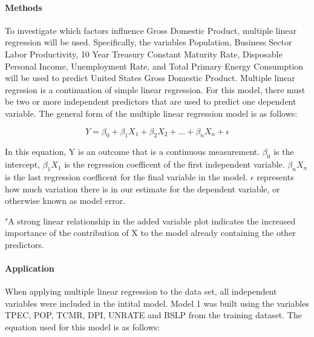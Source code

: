 \documentclass[12pt]{article}
\begin{document}







\paragraph{Methods} 
To investigate which factors influence Gross Domestic Product, multiple linear regression will be used. 
Specifically, the variables Population, Business Sector Labor Productivity, 10 Year Treasury Constant Maturity Rate, Disposable Personal Income, Unemployment Rate, and Total Primary Energy Consumption will be used to predict United States Gross Domestic Product.
Multiple linear regrssion is a continuation of simple linear regression. 
For this model, there must be two or more independent predictors that are used to predict one dependent variable. 
The general form of the multiple linear regression model is as follows: 


\begin{equation}
  Y = \beta_0 + \beta_1 X_1 + \beta_2 X_2 + ... + \beta_n X_n + \epsilon
\end{equation}

In this equation, Y is an outcome that is a continuous measurement. $\beta_0$ is the intercept, $\beta_1 X_1$ is the regression coefficent of the first independent variable. 
$\beta_n X_n$ is the last regression coefficent for the final variable in the model.
$\epsilon$ represents how much variation there is in our estimate for the dependent variable, or otherwise known as model error. 


 


"A strong linear relationship in the added variable plot indicates the increased importance of the contribution of X to the model already containing the other predictors.



\paragraph{Application}

When applying multiple linear regression to the data set, all independent variables were included in the intital model.
Model 1 was built using the variables TPEC, POP, TCMR, DPI, UNRATE and BSLP from the training dataset. 
The equation used for this model is as follows:
\end{document}
